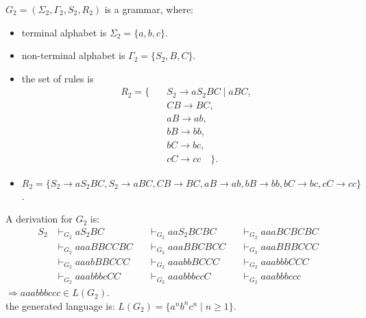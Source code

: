 \documentclass[a4paper,11pt,utf8]{article}
\begin{document}
\begin{tcolorbox}[title=example 3,colback=white,colframe=black,width=\textwidth,arc=0pt]
    $G_2 = (\Sigma_2, \Gamma_2, S_2, R_2)$ is a grammar, where:
    \begin{itemize}
        \item terminal alphabet is $\Sigma_2 = \{a,b,c\}$.
        \item non-terminal alphabet is $\Gamma_2 = \{S_2, B,C\}$.
        \item the set of rules is \[
            \begin{aligned}
                R_2 = \{ \quad & S_2 \to a S_2 BC \mid aBC, \\[1ex]
                & CB \to BC, \\[1ex]
                & aB \to ab, \\[1ex]
                & bB \to bb, \\[1ex]
                & bC \to bc, \\[1ex]
                & cC \to cc \quad \}.
            \end{aligned}
            \]
        \item $R_2 = \{S_2 \to a S_2 BC, S_2 \to aBC, CB \to BC, aB \to ab, bB \to bb, bC \to bc, cC \to cc\}$.
    \end{itemize}
    A derivation for $G_2$ is:
    \[
        \begin{aligned}
            S_2 &\vdash_{G_2} a S_2 BC  &&\vdash_{G_2} aa S_2 BCBC &&\vdash_{G_2} aaaBCBCBC \\[1ex]
                &\vdash_{G_2} aaaBBCCBC &&\vdash_{G_2} aaaBBCBCC   &&\vdash_{G_2} aaaBBBCCC \\[1ex]
                &\vdash_{G_2} aaabBBCCC &&\vdash_{G_2} aaabbBCCC   &&\vdash_{G_2} aaabbbCCC \\[1ex]
                &\vdash_{G_2} aaabbbcCC &&\vdash_{G_2} aaabbbccC   &&\vdash_{G_2} aaabbbccc
        \end{aligned}
    \]
    $\Rightarrow aaabbbccc \in L(G_2)$. \\
    \lineindent the generated language is: $L(G_2) = \{a^nb^nc^n \mid n \geq 1\}$.
\end{tcolorbox}
\end{document}
